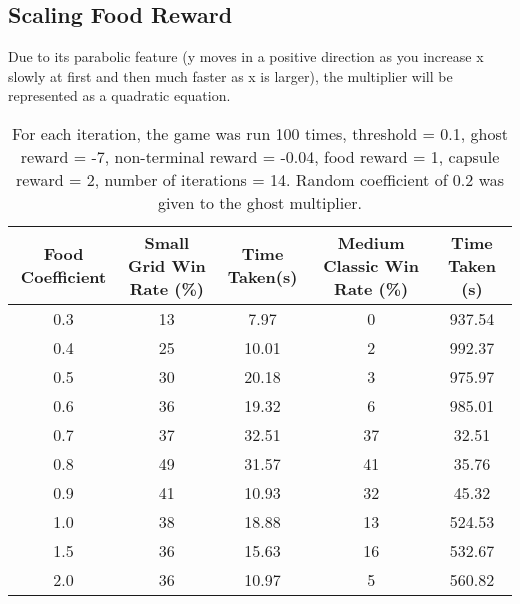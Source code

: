 \documentclass[12pt]{report}
\begin{document}
            \subsection*{Scaling Food Reward}
            Due to its parabolic feature (y moves in a positive direction as you increase x slowly at first and then much faster as x is larger), the multiplier will be represented as a quadratic equation.
              \begin{table}[H]
                \begin{center}
                  \begin{adjustbox}{max width=\textwidth}
                    \begin{tabular}{*{5}{c}}
                      \textbf{Food Coefficient} & \textbf{Small Grid Win Rate (\%)} & \textbf{Time Taken(s)} & \textbf{Medium Classic Win Rate (\%)} & \textbf{Time Taken (s)}\\
                    \hline
                          0.3 & 13 & 7.97 & 0 & 937.54 \\
                          0.4 & 25 & 10.01 & 2 & 992.37 \\
                          0.5 & 30 & 20.18 & 3 & 975.97 \\
                          0.6 & 36 & 19.32 & 6 & 985.01 \\
                          0.7 & 37 & 32.51 & 37 & 32.51 \\
                          0.8 & 49 & 31.57 & 41 & 35.76 \\
                          0.9 & 41 & 10.93 & 32 & 45.32 \\
                          1.0 & 38 & 18.88 & 13 & 524.53 \\
                          1.5 & 36 & 15.63 & 16 & 532.67 \\
                          2.0 & 36 & 10.97 & 5 & 560.82 \\

                  \end{tabular}
                  \end{adjustbox}
                  \caption{For each iteration, the game was run 100 times, threshold = 0.1, ghost reward = -7, non-terminal reward = -0.04, food reward = 1, capsule reward = 2, number of iterations = 14. Random coefficient of 0.2 was given to the ghost multiplier.}
                  \label{tab:table4}
                \end{center}
              \end{table}
              \vspace{-9mm}
\end{document}
